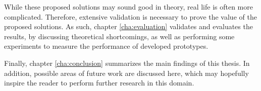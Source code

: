 While these proposed solutions may sound good in theory, real life is often more complicated. Therefore, extensive validation is necessary to prove the value of the proposed solutions. As such, chapter \ref{cha:evaluation} validates and evaluates the results, by discussing theoretical shortcomings, as well as performing some experiments to measure the performance of developed prototypes. 

Finally, chapter \ref{cha:conclusion} summarizes the main findings of this thesis. In addition, possible areas of future work are discussed here, which may hopefully inspire the reader to perform further research in this domain.
